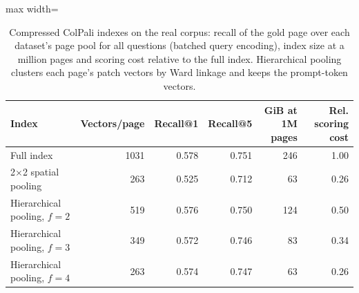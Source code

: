 \begin{table}[t]
\centering
\caption{Compressed ColPali indexes on the real corpus: recall of the gold page over each dataset's page pool for all questions (batched query encoding), index size at a million pages and scoring cost relative to the full index. Hierarchical pooling clusters each page's patch vectors by Ward linkage and keeps the prompt-token vectors.}
\label{tab:token_pooling}
\begin{adjustbox}{max width=\linewidth}
\begin{tabular}{lrrrrr}
\toprule
\textbf{Index} & \textbf{Vectors/page} & \textbf{Recall@1} & \textbf{Recall@5} & \textbf{GiB at 1M pages} & \textbf{Rel. scoring cost} \\
\midrule
Full index & 1031 & 0.578 & 0.751 & 246 & 1.00 \\
2$\times$2 spatial pooling & 263 & 0.525 & 0.712 & 63 & 0.26 \\
Hierarchical pooling, $f = 2$ & 519 & 0.576 & 0.750 & 124 & 0.50 \\
Hierarchical pooling, $f = 3$ & 349 & 0.572 & 0.746 & 83 & 0.34 \\
Hierarchical pooling, $f = 4$ & 263 & 0.574 & 0.747 & 63 & 0.26 \\
\bottomrule
\end{tabular}
\end{adjustbox}
\end{table}
